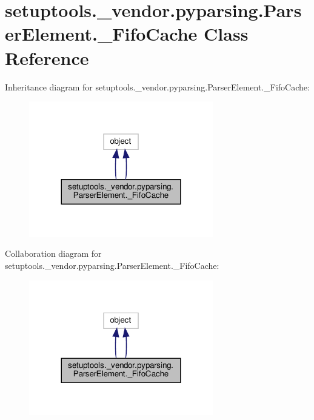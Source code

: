 \hypertarget{classsetuptools_1_1__vendor_1_1pyparsing_1_1ParserElement_1_1__FifoCache}{}\section{setuptools.\+\_\+vendor.\+pyparsing.\+Parser\+Element.\+\_\+\+Fifo\+Cache Class Reference}
\label{classsetuptools_1_1__vendor_1_1pyparsing_1_1ParserElement_1_1__FifoCache}


Inheritance diagram for setuptools.\+\_\+vendor.\+pyparsing.\+Parser\+Element.\+\_\+\+Fifo\+Cache\+:
\nopagebreak
\begin{figure}[H]
\begin{center}
\leavevmode
\includegraphics[width=227pt]{classsetuptools_1_1__vendor_1_1pyparsing_1_1ParserElement_1_1__FifoCache__inherit__graph}
\end{center}
\end{figure}


Collaboration diagram for setuptools.\+\_\+vendor.\+pyparsing.\+Parser\+Element.\+\_\+\+Fifo\+Cache\+:
\nopagebreak
\begin{figure}[H]
\begin{center}
\leavevmode
\includegraphics[width=227pt]{classsetuptools_1_1__vendor_1_1pyparsing_1_1ParserElement_1_1__FifoCache__coll__graph}
\end{center}
\end{figure}
